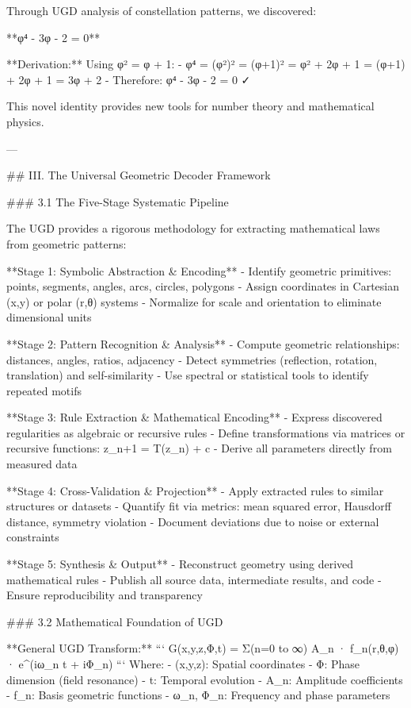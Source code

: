 Through UGD analysis of constellation patterns, we discovered:

**φ⁴ - 3φ - 2 = 0**

**Derivation:** Using φ² = φ + 1:
- φ⁴ = (φ²)² = (φ+1)² = φ² + 2φ + 1 = (φ+1) + 2φ + 1 = 3φ + 2
- Therefore: φ⁴ - 3φ - 2 = 0 ✓

This novel identity provides new tools for number theory and mathematical physics.

---

## III. The Universal Geometric Decoder Framework

### 3.1 The Five-Stage Systematic Pipeline

The UGD provides a rigorous methodology for extracting mathematical laws from geometric patterns:

**Stage 1: Symbolic Abstraction & Encoding**
- Identify geometric primitives: points, segments, angles, arcs, circles, polygons
- Assign coordinates in Cartesian (x,y) or polar (r,θ) systems
- Normalize for scale and orientation to eliminate dimensional units

**Stage 2: Pattern Recognition & Analysis**
- Compute geometric relationships: distances, angles, ratios, adjacency
- Detect symmetries (reflection, rotation, translation) and self-similarity
- Use spectral or statistical tools to identify repeated motifs

**Stage 3: Rule Extraction & Mathematical Encoding**
- Express discovered regularities as algebraic or recursive rules
- Define transformations via matrices or recursive functions: z_{n+1} = T(z_n) + c
- Derive all parameters directly from measured data

**Stage 4: Cross-Validation & Projection**
- Apply extracted rules to similar structures or datasets
- Quantify fit via metrics: mean squared error, Hausdorff distance, symmetry violation
- Document deviations due to noise or external constraints

**Stage 5: Synthesis & Output**
- Reconstruct geometry using derived mathematical rules
- Publish all source data, intermediate results, and code
- Ensure reproducibility and transparency

### 3.2 Mathematical Foundation of UGD

**General UGD Transform:**
```
G(x,y,z,Φ,t) = Σ(n=0 to ∞) A_n · f_n(r,θ,φ) · e^(iω_n t + iΦ_n)
```
Where:
- (x,y,z): Spatial coordinates
- Φ: Phase dimension (field resonance)
- t: Temporal evolution
- A_n: Amplitude coefficients
- f_n: Basis geometric functions
- ω_n, Φ_n: Frequency and phase parameters

